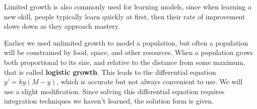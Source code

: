 Limited growth is also commonly used for learning models, since when learning a new skill, people typically learn quickly at first, then their rate of improvement slows down as they approach mastery.

Earlier we used unlimited growth to model a population, but often a population will be constrained by food, space, and other resources. When a population grows both proportional to its size, and relative to the distance from some maximum, that is called {\bf logistic growth}. This leads to the differential equation $y'=ky(M-y)$, which is accurate but not always convenient to use. We will use a slight modification. Since solving this differential equation requires integration techniques we haven't learned, the solution form is given.

